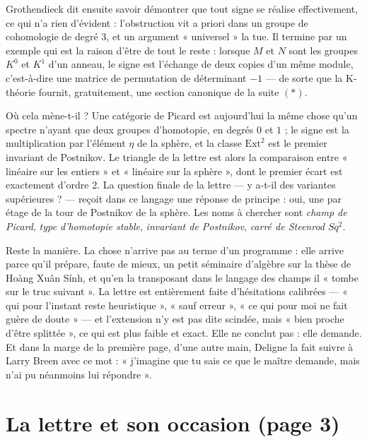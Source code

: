 \documentclass[11pt,a4paper]{article}
\begin{document}
\begin{resume}
Grothendieck dit ensuite savoir démontrer que tout signe se réalise
effectivement, ce qui n'a rien d'évident : l'obstruction vit a priori dans un groupe de cohomologie de degré $3$, et un argument « universel » la tue. Il termine par
un exemple qui est la raison d'être de tout le reste : lorsque $M$ et $N$ sont
les groupes $K^{0}$ et $K^{1}$ d'un anneau, le signe est l'échange de deux
copies d'un même module, c'est-à-dire une matrice de permutation de
déterminant $-1$ --- de sorte que la K-théorie fournit, gratuitement, une
section canonique de la suite $(*)$.

Où cela mène-t-il ? Une catégorie de Picard est aujourd'hui la même chose
qu'un spectre n'ayant que deux groupes d'homotopie, en degrés $0$ et $1$ ; le
signe est la multiplication par l'élément $\eta$ de la sphère, et la classe
$\mathrm{Ext}^2$ est le premier invariant de Postnikov. Le triangle de la
lettre est alors la comparaison entre « linéaire sur les entiers » et
« linéaire sur la sphère », dont le premier écart est exactement d'ordre $2$.
La question finale de la lettre --- y a-t-il des variantes supérieures ? ---
reçoit dans ce langage une réponse de principe : oui, une par étage de la
tour de Postnikov de la sphère. Les noms à chercher sont \emph{champ de
Picard}, \emph{type d'homotopie stable}, \emph{invariant de Postnikov},
\emph{carré de Steenrod $Sq^{2}$}.

Reste la manière. La chose n'arrive pas au terme d'un programme : elle arrive
parce qu'il prépare, faute de mieux, un petit séminaire d'algèbre sur la thèse
de Hoàng Xuân Sính, et qu'en la transposant dans le langage des champs il
« tombe sur le truc suivant ». La lettre est entièrement faite d'hésitations
calibrées --- « qui pour l'instant reste heuristique », « sauf erreur », « ce
qui pour moi ne fait guère de doute » --- et l'extension n'y est pas dite
scindée, mais « bien proche d'être splittée », ce qui est plus faible et
exact. Elle ne conclut pas :
elle demande. Et dans la marge de la première page, d'une autre main, Deligne
la fait suivre à Larry Breen avec ce mot : « j'imagine que tu sais ce que le
maître demande, mais n'ai pu néanmoins lui répondre ».

\end{resume}

\section*{La lettre et son occasion (page 3)}
\end{document}
